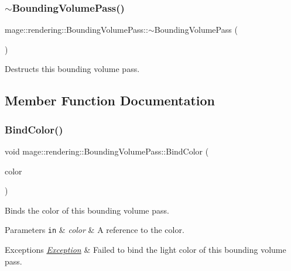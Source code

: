 \subsubsection{\texorpdfstring{$\sim$\+Bounding\+Volume\+Pass()}{~BoundingVolumePass()}}
{\footnotesize\ttfamily mage\+::rendering\+::\+Bounding\+Volume\+Pass\+::$\sim$\+Bounding\+Volume\+Pass (\begin{DoxyParamCaption}{ }\end{DoxyParamCaption})\hspace{0.3cm}{\ttfamily [default]}}

Destructs this bounding volume pass. 

\subsection{Member Function Documentation}
\mbox{\label{classmage_1_1rendering_1_1_bounding_volume_pass_a52c5852cfc290c5d07059537a26b71ea}} 
\subsubsection{\texorpdfstring{Bind\+Color()}{BindColor()}}
{\footnotesize\ttfamily void mage\+::rendering\+::\+Bounding\+Volume\+Pass\+::\+Bind\+Color (\begin{DoxyParamCaption}\item[{const \mbox{\hyperlink{structmage_1_1_r_g_b_a}{R\+G\+BA}} \&}]{color }\end{DoxyParamCaption})\hspace{0.3cm}{\ttfamily [private]}}

Binds the color of this bounding volume pass.


\begin{DoxyParams}[1]{Parameters}
\mbox{\tt in}  & {\em color} & A reference to the color. \\
\hline
\end{DoxyParams}

\begin{DoxyExceptions}{Exceptions}
{\em \mbox{\hyperlink{classmage_1_1_exception}{Exception}}} & Failed to bind the light color of this bounding volume pass. \\
\hline
\end{DoxyExceptions}
\mbox{\label{classmage_1_1rendering_1_1_bounding_volume_pass_a117de59e78f7219b10795678eeacff34}} 
